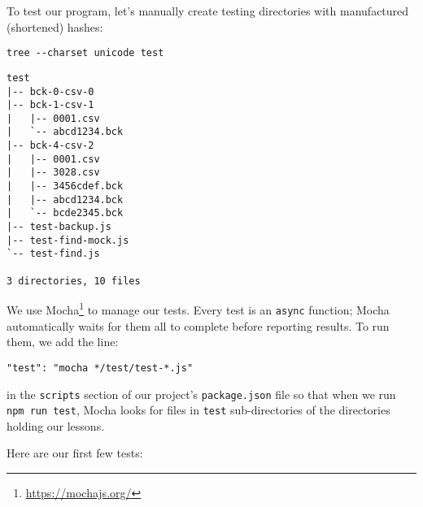 \documentclass[krantzl]{krantz}
\newcommand{\hreffoot}[2]{{#1}\footnote{\href{#2}{#2}}}
\begin{document}
To test our program,
let's manually create testing directories with manufactured (shortened) hashes:


\begin{lstlisting}[frame=single,frameround=tttt]
tree --charset unicode test
\end{lstlisting}



\begin{lstlisting}[frame=single,frameround=tttt]
test
|-- bck-0-csv-0
|-- bck-1-csv-1
|   |-- 0001.csv
|   `-- abcd1234.bck
|-- bck-4-csv-2
|   |-- 0001.csv
|   |-- 3028.csv
|   |-- 3456cdef.bck
|   |-- abcd1234.bck
|   `-- bcde2345.bck
|-- test-backup.js
|-- test-find-mock.js
`-- test-find.js

3 directories, 10 files
\end{lstlisting}



We use \hreffoot{Mocha}{https://mochajs.org/} to manage our tests.
Every test is an \texttt{async} function;
Mocha automatically waits for them all to complete before reporting results.
To run them,
we add the line:

\begin{lstlisting}[frame=single,frameround=tttt]
"test": "mocha */test/test-*.js"
\end{lstlisting}


\noindent in the \texttt{scripts} section of our project's \texttt{package.json} file
so that when we run \texttt{npm run test},
Mocha looks for files in \texttt{test} sub-directories of the directories holding our lessons.


Here are our first few tests:
\end{document}
